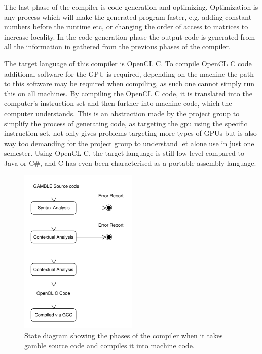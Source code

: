The last phase of the compiler is code generation and optimizing.
Optimization is any process which will make the generated program faster, e.g. adding constant numbers before the runtime etc, or changing the order of access to matrices to increase locality. 
In the code generation phase the output code is generated from all the information in gathered from the previous phases of the compiler.

The target language of this compiler is OpenCL C.
To compile OpenCL C code additional software for the GPU is required, depending on the machine the path to this software may be required when compiling, as such one cannot simply run this on all machines.
By compiling the OpenCL C code, it is translated into the computer's instruction set and then further into machine code, which the computer understands.
This is an abstraction made by the project group to simplify the process of generating code, as targeting the \acrshort{gpu} using the specific instruction set, not only gives problems targeting more types of GPUs but is also way too demanding for the project group to understand let alone use in just one semester.
Using OpenCL C, the target language is still low level compared to Java or C\#, and C has even been characterised as a portable assembly language.\citep{CPort}

\begin{figure}
\centering
\includegraphics[width=0.5\textwidth]{figures/ClassDiagrams/CompilerDiagram.pdf}
\caption{State diagram showing the phases of the compiler when it takes \gls{gamble} source code and compiles it into machine code.}\label{fig:phases}
\end{figure}


